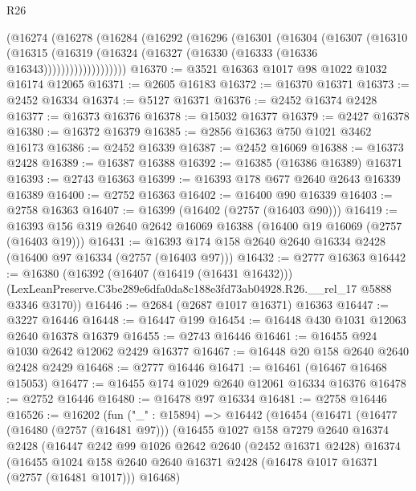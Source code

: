 \begin{lexlean}{R26}
\begin{coremodule}
          (@16274
            (@16278
              (@16284
                (@16292
                  (@16296
                    (@16301
                      (@16304
                        (@16307
                          (@16310
                            (@16315
                              (@16319
                                (@16324 (@16327 (@16330 (@16333 (@16336 @16343)))))))))))))))))))
@16370 := @3521 @16363 @1017 @98 @1022 @1032 @16174 @12065
@16371 := @2605 @16183
@16372 := @16370 @16371
@16373 := @2452 @16334
@16374 := @5127 @16371
@16376 := @2452 @16374 @2428
@16377 := @16373 @16376
@16378 := @15032 @16377
@16379 := @2427 @16378
@16380 := @16372 @16379
@16385 := @2856 @16363 @750 @1021 @3462 @16173
@16386 := @2452 @16339
@16387 := @2452 @16069
@16388 := @16373 @2428
@16389 := @16387 @16388
@16392 := @16385 (@16386 @16389) @16371
@16393 := @2743 @16363
@16399 := @16393 @178 @677 @2640 @2643 @16339 @16389
@16400 := @2752 @16363
@16402 := @16400 @90 @16339
@16403 := @2758 @16363
@16407 := @16399 (@16402 (@2757 (@16403 @90)))
@16419 := @16393 @156 @319 @2640 @2642 @16069 @16388 (@16400 @19 @16069 (@2757 (@16403 @19)))
@16431 := @16393 @174 @158 @2640 @2640 @16334 @2428 (@16400 @97 @16334 (@2757 (@16403 @97)))
@16432 := @2777 @16363
@16442 := @16380
    (@16392
      (@16407 (@16419 (@16431 @16432)))
      (LexLeanPreserve.C3be289e6dfa0da8c188e3fd73ab04928.R26.__rel_17 @5888 @3346 @3170))
@16446 := @2684 (@2687 @1017 @16371) @16363
@16447 := @3227 @16446
@16448 := @16447 @199
@16454 := @16448 @430 @1031 @12063 @2640 @16378 @16379
@16455 := @2743 @16446
@16461 := @16455 @924 @1030 @2642 @12062 @2429 @16377
@16467 := @16448 @20 @158 @2640 @2640 @2428 @2429
@16468 := @2777 @16446
@16471 := @16461 (@16467 @16468 @15053)
@16477 := @16455 @174 @1029 @2640 @12061 @16334 @16376
@16478 := @2752 @16446
@16480 := @16478 @97 @16334
@16481 := @2758 @16446
@16526 := @16202
    (fun ("_" : @15894) =>
    @16442
      (@16454
        (@16471
          (@16477
            (@16480 (@2757 (@16481 @97)))
            (@16455
              @1027
              @158
              @7279
              @2640
              @16374
              @2428
              (@16447
                @242
                @99
                @1026
                @2642
                @2640
                (@2452 @16371 @2428)
                @16374
                (@16455
                  @1024
                  @158
                  @2640
                  @2640
                  @16371
                  @2428
                  (@16478 @1017 @16371 (@2757 (@16481 @1017)))
                  @16468)

\end{coremodule}
\end{lexlean}
